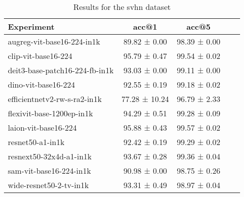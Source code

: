 \begin{table}[htbp]
\caption{Results for the svhn dataset}
\begin{tabular}{|l|c|c|c|c|}\hline
Experiment & acc@1 & acc@5\\
\hline
augreg-vit-base16-224-in1k & 89.82 ± 0.00 & 98.39 ± 0.00\\
\hline
clip-vit-base16-224 & 95.79 ± 0.47 & 99.54 ± 0.02\\
\hline
deit3-base-patch16-224-fb-in1k & 93.03 ± 0.00 & 99.11 ± 0.00\\
\hline
dino-vit-base16-224 & 92.55 ± 0.19 & 99.18 ± 0.02\\
\hline
efficientnetv2-rw-s-ra2-in1k & 77.28 ± 10.24 & 96.79 ± 2.33\\
\hline
flexivit-base-1200ep-in1k & 94.29 ± 0.51 & 99.28 ± 0.09\\
\hline
laion-vit-base16-224 & 95.88 ± 0.43 & 99.57 ± 0.02\\
\hline
resnet50-a1-in1k & 92.42 ± 0.19 & 99.29 ± 0.02\\
\hline
resnext50-32x4d-a1-in1k & 93.67 ± 0.28 & 99.36 ± 0.04\\
\hline
sam-vit-base16-224-in1k & 90.98 ± 0.00 & 98.75 ± 0.26\\
\hline
wide-resnet50-2-tv-in1k & 93.31 ± 0.49 & 98.97 ± 0.04\\
\hline
\end{tabular}
\end{table}

